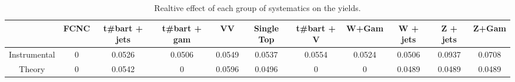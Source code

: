\begin{table}[htbp]
\begin{center}
\begin{tabular}{|c|c|c|c|c|c|c|c|c|c|c|}
\hline 
      & FCNC      & t#bar{t} + jets      & t#bar{t} +  gam      & VV      & Single Top      & t#bar{t} + V      & W+Gam      & W + jets      & Z + jets      & Z+Gam \\ 
\hline 
 Instrumental & 0 & 0.0526 & 0.0506 & 0.0549 & 0.0537 & 0.0554 & 0.0524 & 0.0506 & 0.0937 & 0.0708 \\ 
 Theory & 0 & 0.0542 & 0 & 0.0596 & 0.0496 & 0 & 0 & 0.0489 & 0.0489 & 0.0489 \\ 
\hline 
\end{tabular} 
\caption{Realtive effect of each group of systematics on the yields.} 
\end{center} 
\end{table} 
